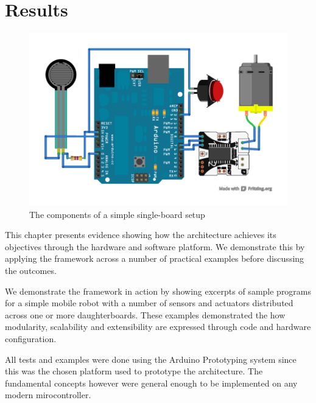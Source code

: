 \chapter{Results} 
\label{chap:results}

\begin{figure}
  \begin{center}
    \includegraphics[width=1.0\columnwidth]{Figures/simple-example.pdf}
    \caption{The components of a simple single-board \xten setup} \label{fig:singleboard}
  \end{center}
\end{figure}

This chapter presents evidence showing how the \xten architecture achieves its objectives through the hardware and software platform. We demonstrate this by applying the framework across a number of practical examples before discussing the outcomes.

 We demonstrate the framework in action by showing excerpts of sample programs for a simple mobile robot with a number of sensors and actuators distributed across one or more daughterboards. These examples demonstrated the how modularity, scalability and extensibility are expressed through code and hardware configuration.
 
All tests and examples were done using the Arduino Prototyping system since this was the chosen platform used to prototype the \xten architecture. The fundamental concepts however were general enough to be implemented on any modern mirocontroller.

